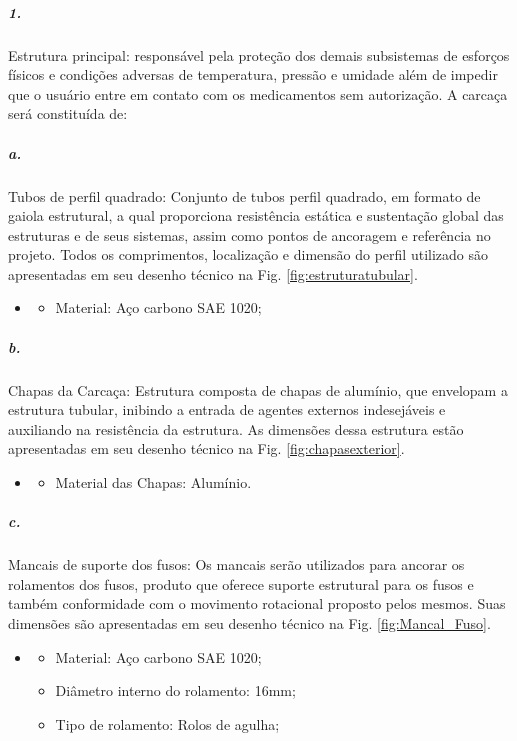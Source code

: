     
\subparagraph*{1.}
Estrutura principal: responsável pela proteção dos demais subsistemas de esforços físicos e condições adversas de temperatura, pressão e umidade além de impedir que o usuário entre em contato com os medicamentos sem autorização. A carcaça será constituída de:

    \subparagraph*{a. } \label{retorno_tubos_perfilquadrado}
    Tubos de perfil quadrado:  Conjunto de tubos perfil quadrado, em formato de gaiola estrutural, a qual proporciona resistência estática e sustentação global das estruturas e de seus sistemas, assim como pontos de ancoragem e referência no projeto. Todos os comprimentos, localização e dimensão do perfil utilizado são apresentadas em seu desenho técnico na Fig. \ref{fig:estruturatubular}.
   \begin{itemize}
   \item[]
   \begin{itemize}
      \item Material: Aço carbono SAE 1020;
   \end{itemize}
   \end{itemize}
     
    \subparagraph*{b. }  \label{retorno_chapas} 
    Chapas da Carcaça: Estrutura composta de chapas de alumínio, que envelopam a estrutura tubular, inibindo a entrada de agentes externos indesejáveis e auxiliando na resistência da estrutura. As dimensões dessa estrutura estão apresentadas em seu desenho técnico na Fig. \ref{fig:chapasexterior}.
   \begin{itemize}
   \item[]
   \begin{itemize}
       \item Material das Chapas: Alumínio.
   \end{itemize}
   \end{itemize}
    
     
    \subparagraph*{c.} \label{Retorno_Mancal_de_suporte} 
    Mancais de suporte dos fusos: Os mancais serão utilizados para ancorar os rolamentos dos fusos, produto que oferece suporte estrutural para os fusos e também conformidade com o movimento rotacional proposto pelos mesmos. Suas dimensões são apresentadas em seu desenho técnico na Fig. \ref{fig:Mancal_Fuso}.
    
   \begin{itemize}
   \item[]
   \begin{itemize}
       \item  Material: Aço carbono SAE 1020;
       \item  Diâmetro interno do rolamento: 16mm;
       \item  Tipo de rolamento: Rolos de agulha;
   \end{itemize}
   \end{itemize}
     

